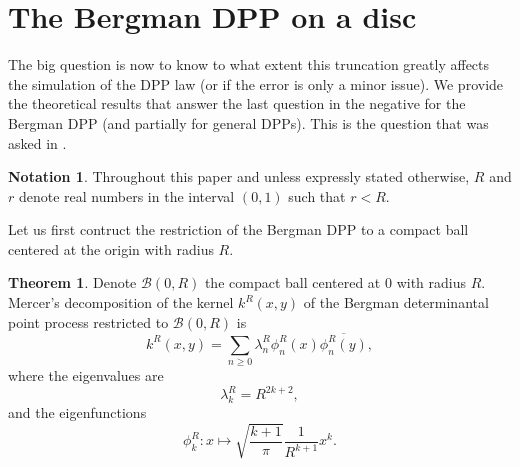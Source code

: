 \documentclass[11pt]{article}
\theoremstyle{plain}
\theoremstyle{definition}
\newtheorem{theorem}[definition]{Theorem}
\newtheorem{notation}[definition]{Notation}
\begin{document}
\section{The Bergman DPP on a disc}

The big question is now to know to what extent this truncation greatly affects the simulation of the DPP law (or if the error is only a minor issue). We provide the theoretical results that answer the last question in the negative for the Bergman DPP (and partially for general DPPs). This is the question that was asked in \cite{Decreusefond2016}.

\begin{notation}
    Throughout this paper and unless expressly stated otherwise, $R$ and $r$ denote real
numbers in the interval $(0, 1)$ such that $r < R$.
\end{notation}

Let us first contruct the restriction of the Bergman DPP to a compact ball centered at the origin
with radius $R$.

\begin{theorem} Denote $\mathcal{B}(0, R)$ the compact ball centered at 0 with radius $R$. Mercer's decomposition of the kernel $k^R(x,y)$ of the Bergman determinantal point process restricted to
$\mathcal{B}(0, R)$ is
\[
k^R(x,y) = \sum_{n \ge 0} \lambda_n^R \phi_n^R(x) \overline{\phi_n^R(y)},
\]
where the eigenvalues are
\[
\lambda_k^R = R^{2k+2},
\]
and the eigenfunctions
\[
\phi_k^R : x \mapsto \sqrt{\frac{k+1}{\pi}} \frac{1}{R^{k+1}} x^k.
\]
\end{theorem}
\end{document}
